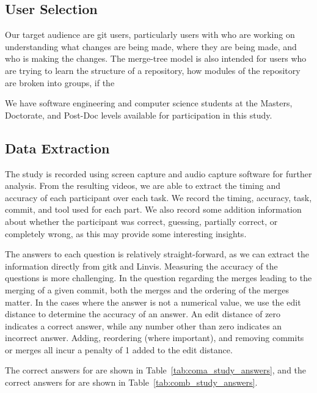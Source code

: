 \subsection{User Selection}
\label{sub:user_selection}

Our target audience are git users, particularly users with who are
working on understanding what changes are being made, where they are
being made, and who is making the changes. The merge-tree model is also
intended for users who are trying to learn the structure of a
repository, how modules of the repository are broken into groups, if the

We have software engineering and computer science students at the
Masters, Doctorate, and Post-Doc levels available for participation in
this study. 


\subsection{Data Extraction}
\label{sub:data_extraction}

The study is recorded using screen capture and audio capture software
for further analysis. From the resulting videos, we are able to extract
the timing and accuracy of each participant over each task. We record
the timing, accuracy, task, commit, and tool used for each part. We also
record some addition information about whether the participant was
correct, guessing, partially correct, or completely wrong, as this may
provide some interesting insights.

The answers to each question is relatively straight-forward, as we can
extract the information directly from gitk and Linvis. Measuring the
accuracy of the questions is more challenging. In the question regarding
the merges leading to the merging of a given commit, both the merges and
the ordering of the merges matter. In the cases where the answer is not
a numerical value, we use the edit distance to determine the accuracy of
an answer. An edit distance of zero indicates a correct answer, while
any number other than zero indicates an incorrect answer. Adding,
reordering (where important), and removing commits or merges all incur a
penalty of 1 added to the edit distance.

The correct answers for \comA are shown in
Table~\ref{tab:coma_study_answers}, and the correct answers for \comB are
shown in Table~\ref{tab:comb_study_answers}.

